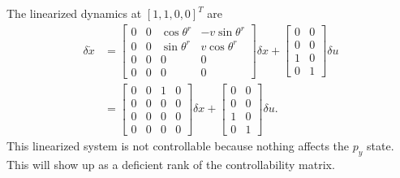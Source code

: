 The linearized dynamics at $[1,1,0,0]^T$ are
\begin{align}
    \delta \dot{x} &= 
    \begin{bmatrix}
        0 & 0 & \cos\theta^r & -v\sin\theta^r \\
        0 & 0 & \sin\theta^r & v\cos\theta^r \\
        0 & 0 & 0 & 0 \\
        0 & 0 & 0 & 0
    \end{bmatrix} \delta x + 
    \begin{bmatrix}
        0 & 0 \\
        0 & 0 \\
        1 & 0 \\
        0 & 1
    \end{bmatrix} \delta u \\
    &= \begin{bmatrix}
        0 & 0 & 1 & 0 \\
        0 & 0 & 0 & 0 \\
        0 & 0 & 0 & 0 \\
        0 & 0 & 0 & 0
    \end{bmatrix} \delta x + 
    \begin{bmatrix}
        0 & 0 \\
        0 & 0 \\
        1 & 0 \\
        0 & 1
    \end{bmatrix} \delta u.
\end{align}
This linearized system is not controllable because nothing affects the $p_y$
state. This will show up as a deficient rank of the controllability matrix.